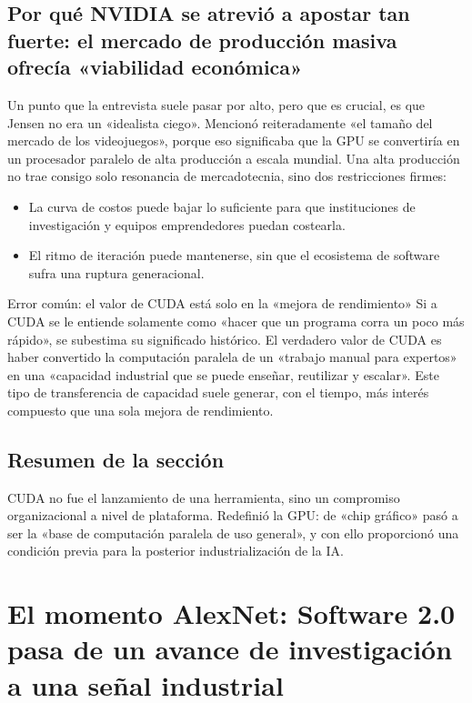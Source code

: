 \documentclass[a4paper]{article}
\begin{document}
\subsection{Por qué NVIDIA se atrevió a apostar tan fuerte: el mercado de producción masiva ofrecía «viabilidad económica»}

Un punto que la entrevista suele pasar por alto, pero que es crucial, es que Jensen no era un «idealista ciego». Mencionó reiteradamente «el tamaño del mercado de los videojuegos», porque eso significaba que la GPU se convertiría en un procesador paralelo de alta producción a escala mundial. Una alta producción no trae consigo solo resonancia de mercadotecnia, sino dos restricciones firmes:
\begin{itemize}
    \item La curva de costos puede bajar lo suficiente para que instituciones de investigación y equipos emprendedores puedan costearla.
    \item El ritmo de iteración puede mantenerse, sin que el ecosistema de software sufra una ruptura generacional.
\end{itemize}

\begin{warningbox}{Error común: el valor de CUDA está solo en la «mejora de rendimiento»}
Si a CUDA se le entiende solamente como «hacer que un programa corra un poco más rápido», se subestima su significado histórico. El verdadero valor de CUDA es haber convertido la computación paralela de un «trabajo manual para expertos» en una «capacidad industrial que se puede enseñar, reutilizar y escalar». Este tipo de transferencia de capacidad suele generar, con el tiempo, más interés compuesto que una sola mejora de rendimiento.
\end{warningbox}

\subsection{Resumen de la sección}
CUDA no fue el lanzamiento de una herramienta, sino un compromiso organizacional a nivel de plataforma. Redefinió la GPU: de «chip gráfico» pasó a ser la «base de computación paralela de uso general», y con ello proporcionó una condición previa para la posterior industrialización de la IA.
\section{El momento AlexNet: Software 2.0 pasa de un avance de investigación a una señal industrial}
\end{document}
